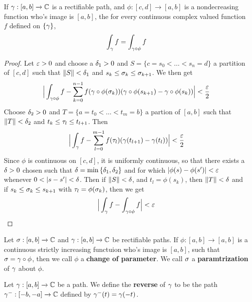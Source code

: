 \begin{theorem}\label{4.2.2}
    If $\gamma:[a,b] \xrightarrow{} \mathbb{C}$ is a rectifiable path, and $\phi:[c,d]
    \xrightarrow{} [a,b]$ is a nondecreasing function who's image is $[a,b]$,
    the for every continuous complex valued function $f$ defined on  $\{\gamma\}$,
    \begin{equation*}
        \int_\gamma{f}=\int_{\gamma \circ \phi}{f}
    \end{equation*}
\end{theorem}
\begin{proof}
    Let $\varepsilon>0$ and choose a  $\delta_1>0$ and $S=\{c=s_0<\dots<s_n=d\}$ a
    partition of $[c,d]$ such that $\|S\|<\delta_1$ and $s_k \leq \sigma_k \leq
    \sigma_{k+1}$. We then get
    \begin{equation*}
        \Big{|} \int_{\gamma \circ \phi}{f}-
        \sum_{k=0}^{n-1}{f(\gamma \circ \phi(\sigma_k))
            (\gamma \circ \phi(s_{k+1})-\gamma \circ \phi(s_k))} \Big{|}<\frac{\varepsilon}{2}
    \end{equation*}
    Choose $\delta_2>0$ and $T=\{a=t_0<\dots<t_m=b\}$ a partion of $[a,b]$ such that
    $\|T\|<\delta_2$ and $t_k \leq \tau_l \leq t_{l+1}$. Then
    \begin{equation*}
        \Big{|} \int_\gamma{f}-\sum_{l=0}^{m-1}{f(\tau_l)(\gamma(t_{l+1})-\gamma(t_l))} \Big{|}
        < \frac{\varepsilon}{2}
    \end{equation*}
    Since $\phi$ is continuous on $[c,d]$, it is uniformly continuous, so that
    there exists a $\delta>0$ chosen such that $\delta=\min{\{\delta_1,\delta_2\}}$ and for
    which $|\phi(s)-\phi(s')|<\varepsilon$ whenever $0<|s-s'|<\d$. Then if $\|S\|<\delta$,
    and  $t_l=\phi(s_k)$, then $\|T\|<\delta$ and if $s_k \leq \sigma_k \leq s_{k+1}$
    with $\tau_l=\phi(\sigma_k)$, then we get
    \begin{equation*}
        \Big{|} \int_\gamma{f}-\int_{\gamma \circ \phi}{f} \Big{|}<\varepsilon
    \end{equation*}
\end{proof}

\begin{definition}
    Let $\sigma:[a,b] \xrightarrow{} \mathbb{C}$ and $\gamma:[a,b] \xrightarrow{} \mathbb{C}$ be
    rectifiable paths. If $\phi:[a,b] \xrightarrow{} [a,b]$ is a continuous
    strictly increasing functuion who's image is $[a,b]$, such that $\sigma=\gamma \circ
    \phi$, then we call  $\phi$ a \textbf{change of parameter}. We call $\sigma$ a
     \textbf{paramtrization} of $\gamma$ about  $\phi$.
\end{definition}

\begin{definition}
    Let $\gamma:[a,b] \xrightarrow{} \mathbb{C}$ be a path. We define the \textbf{reverse}
    of $\gamma$ to be the path $\gamma^-:[-b,-a] \xrightarrow{} \mathbb{C}$ defined by
    $\gamma^-(t)=\gamma(-t)$.
\end{definition}

